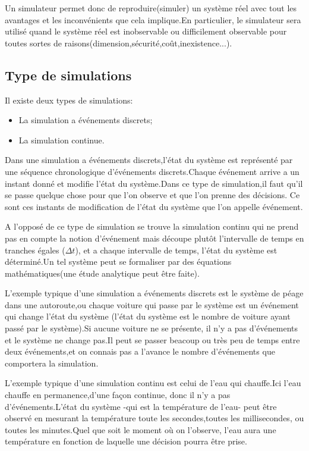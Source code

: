 Un simulateur permet donc de reproduire(simuler) un système réel avec tout les avantages et les inconvénients que cela implique.En particulier, le simulateur sera utilisé quand le système réel est inobservable ou difficilement observable pour toutes sortes de raisons(dimension,sécurité,coût,inexistence...).



\subsection{Type de simulations}
Il existe deux types de simulations:
\begin{itemize}
\item La simulation a événements discrets;
\item La simulation continue.
\end{itemize}

Dans une simulation a événements discrets,l'état du système est représenté par une séquence chronologique d'événements discrets.Chaque événement arrive a un instant donné et modifie l'état du système.Dans ce type de simulation,il faut qu'il se passe quelque chose pour que l'on observe et que l’on prenne des décisions. Ce sont ces instants de modification de l’état du système que l’on appelle événement.

A l'opposé de ce type de simulation se trouve la simulation continu qui ne prend pas en compte la notion d'événement mais découpe plutôt l'intervalle de temps en tranches égales ($\Delta t$),
et a chaque intervalle de temps, l'état du système est déterminé.Un tel système peut se formaliser par des équations mathématiques(une étude analytique peut être faite).

L'exemple typique d'une simulation a  événements discrets est le système de péage dans une autoroute,ou chaque voiture qui passe par le système est un événement qui change l'état du système (l'état du système est le nombre de voiture ayant passé par le système).Si aucune voiture ne se présente, il n'y a pas d'événements et le système ne change pas.Il peut se passer beacoup ou très peu de temps entre deux événements,et on connais pas a l'avance le nombre d'événements que comportera la simulation. 

L'exemple typique d'une simulation continu est celui de l'eau qui chauffe.Ici l'eau chauffe en permanence,d'une façon continue, donc il n'y a pas d'événements.L'état du système -qui est la température de l'eau- peut être observé en mesurant la température toute les secondes,toutes les millisecondes, ou toutes  les minutes.Quel que soit le moment où on l’observe, l’eau aura une température en fonction de laquelle une décision pourra être prise.
  
